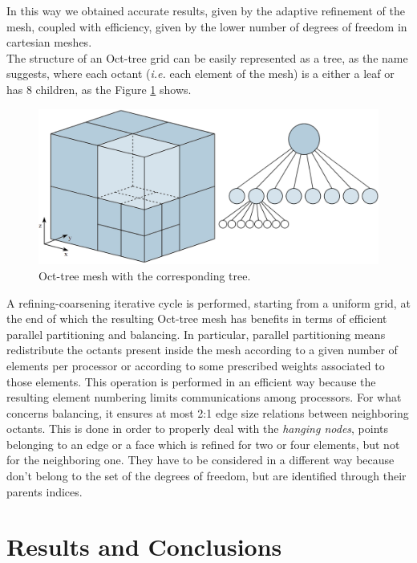 \documentclass[11pt,a4paper,twocolumn]{article}
\begin{document}
In this way we obtained accurate results, given by the adaptive refinement of the mesh, coupled with efficiency, given by the lower number of degrees of freedom in cartesian meshes.   \\
The structure of an Oct-tree grid can be easily represented as a tree, as the name suggests, where each octant ({\it i.e.} each element of the mesh) is a either a leaf or has 8 children, as the Figure \ref{fig:octree} shows. \\
\begin{figure} [H]
    \centering
    \includegraphics[scale=0.16]{Images/octree_tree}
    \caption{Oct-tree mesh with the corresponding tree.}
    \label{fig:octree}
\end{figure}
A refining-coarsening iterative cycle is performed, starting from a uniform grid, at the end of which the resulting Oct-tree mesh has benefits in terms of efficient parallel partitioning and balancing. 
In particular, parallel partitioning means redistribute the octants present inside the mesh according to a given number of elements per processor or 
according to some prescribed weights associated to those elements. This operation is performed in an efficient way because the resulting element numbering limits communications among processors. For what concerns balancing, it ensures at most 2:1 edge size relations between neighboring octants. This is done in order to properly deal with the {\it hanging nodes}, points belonging to an edge or a face which is refined for two or four elements, but not for the neighboring one. They have to be considered in a different way because don't belong to the set of the degrees of freedom, but are identified through their parents indices. 

\section{Results and Conclusions}
\label{sec:results}
\end{document}
